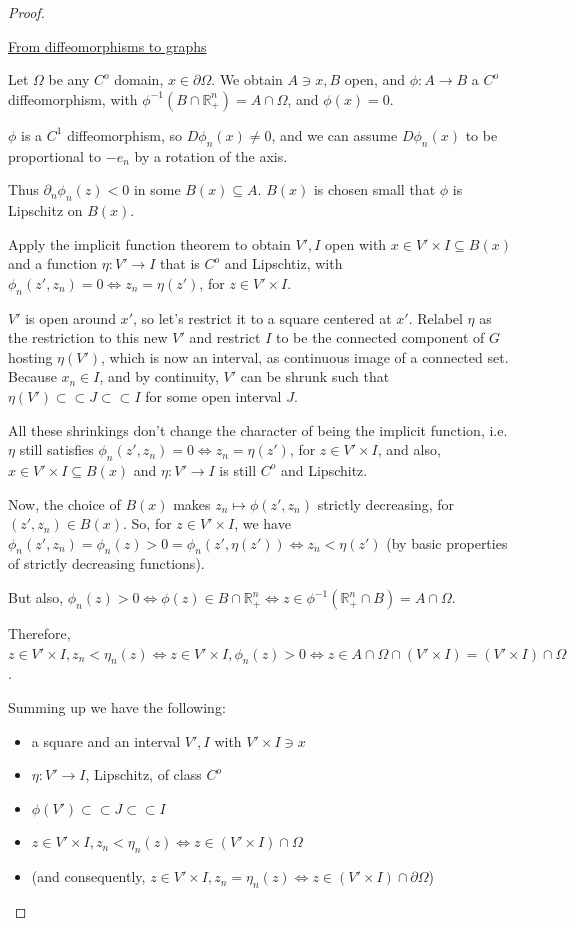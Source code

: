 \documentclass[english,a4paper,12pt,oneside]{scrbook}
\theoremstyle{break}
\newenvironment{mproof}[1][\proofname]{%
  \begin{proof}[#1]$ $\par\nobreak\ignorespaces
}{%
  \end{proof}
}
\renewcommand*{\proofname}{Proof}
\theoremstyle{remark}
\newcommand{\mR}{\mathbb{R}}
\newcommand{\cc}{\subset\subset}
\begin{document}
\begin{mproof}
\underline{From diffeomorphisms to graphs}

Let $\Omega$ be any $C^o$ domain, $x\in \partial \Omega$. We obtain $A\ni x, B$ open, and $\phi: A\rightarrow B$ a $C^o$ diffeomorphism, with $\phi^{-1}(B\cap \mR^n_+)=A\cap \Omega$, and $\phi(x)=0$.

$\phi$ is a $C^1$ diffeomorphism, so $D\phi_n(x)\neq 0$, and we can assume $D\phi_n(x)$ to be proportional to $-e_n$ by a rotation of the axis.

Thus $\partial_n\phi_n(z)<0$ in some $B(x)\subseteq A$. $B(x)$ is chosen small that $\phi$ is Lipschitz on $B(x)$.

Apply the implicit function theorem to obtain $V',I$ open with $x \in V'\times I\subseteq B(x)$ and a function $\eta:V'\rightarrow I$ that is $C^o$ and Lipschtiz, with $\phi_n(z',z_n)=0 \iff z_n = \eta(z')$, for $z \in V'\times I$.

$V'$ is open around $x'$, so let's restrict it to a square centered at $x'$. Relabel $\eta$ as the restriction to this new $V'$ and restrict $I$ to be the connected component of $G$ hosting $\eta(V')$, which is now an interval, as continuous image of a connected set. Because $x_n \in I$, and by continuity, $V'$ can be shrunk such that $\eta(V')\cc J \cc I$ for some open interval $J$. 

All these shrinkings don't change the character of being the implicit function, i.e. $\eta$ still satisfies $\phi_n(z',z_n)=0 \iff z_n = \eta(z')$, for $z \in V'\times I$, and also,  $x \in V'\times I\subseteq B(x)$ and $\eta:V'\rightarrow I$ is still $C^o$ and Lipschitz.

Now, the choice of $B(x)$ makes $z_n\mapsto \phi(z',z_n)$ strictly decreasing, for $(z',z_n) \in B(x)$.  So, for $z \in V'\times I$, we have $\phi_n(z', z_n) = \phi_n(z)>0=\phi_n(z',\eta(z')) \iff z_n<\eta(z')$ (by basic properties of strictly decreasing functions).

But also, $\phi_n(z) >0 \iff \phi(z) \in B\cap \mR^n_+ \iff z \in \phi^{-1}(\mR^n_+\cap B)=A\cap \Omega$.

Therefore, $z \in V'\times I, z_n<\eta_n(z) \iff z \in V'\times I, \phi_n(z) >0 \iff z \in A\cap \Omega \cap (V'\times I) = (V'\times I)\cap \Omega$.

Summing up we have the following:

\begin{itemize}
	\item a square and an interval $V', I$ with $V'\times I \ni x$
	\item $\eta: V'\rightarrow I$, Lipschitz, of class $C^o$
	\item $\phi(V') \cc J \cc I$
	\item $z \in V'\times I, z_n<\eta_n(z) \iff z \in (V'\times I)\cap \Omega$
	\item (and consequently, $z \in V'\times I, z_n=\eta_n(z) \iff z \in (V'\times I)\cap \partial \Omega$)
\end{itemize}


\end{mproof}
\end{document}
